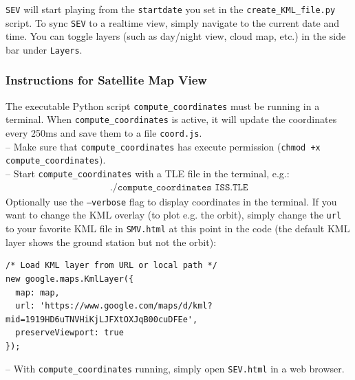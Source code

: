 \documentclass[10pt,a4paper]{article}
\begin{document}
\noindent \texttt{SEV} will start playing from the \texttt{startdate} you set in the \texttt{create\_KML\_file.py} script. To sync \texttt{SEV} to a realtime view, simply navigate to the current date and time. You can toggle layers (such as day/night view, cloud map, etc.) in the side bar under \texttt{Layers}.

\subsubsection{Instructions for Satellite Map View}
The executable Python script \texttt{compute\_coordinates} must be running in a terminal. When \texttt{compute\_coordinates} is active, it will update the coordinates every 250ms and save them to a file \texttt{coord.js}.\\
-- Make sure that \texttt{compute\_coordinates} has execute permission (\texttt{chmod +x compute\_coordinates}).\\
-- Start \texttt{compute\_coordinates} with a TLE file in the terminal, e.g.:
\begin{align*}
\texttt{./compute\_coordinates ISS.TLE}
\end{align*}
Optionally use the \texttt{--verbose} flag to display coordinates in the terminal. If you want to change the KML overlay (to plot e.g. the orbit), simply change the \texttt{url} to your favorite KML file in \texttt{SMV.html} at this point in the code (the default KML layer shows the ground station but not the orbit):
\begin{verbatim}
/* Load KML layer from URL or local path */
new google.maps.KmlLayer({
  map: map,
  url: 'https://www.google.com/maps/d/kml?mid=1919HD6uTNVHiKjLJFXtOXJqB00cuDFEe',
  preserveViewport: true
});
\end{verbatim}
\noindent -- With \texttt{compute\_coordinates} running, simply open \texttt{SEV.html} in a web browser.
\end{document}
